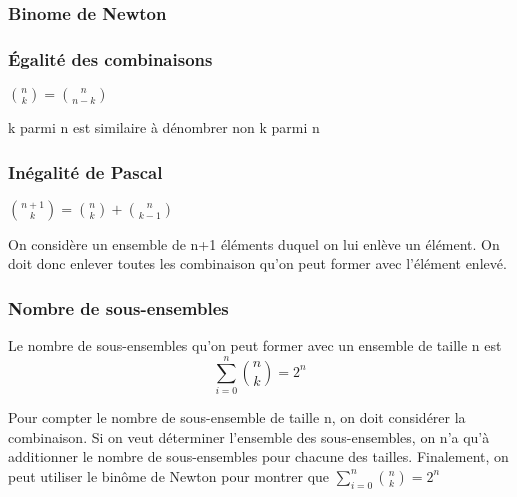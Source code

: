 \documentclass{article}
\begin{document}
\subsubsection{Binome de Newton}%
\label{ssub:Binome de Newton}

\subsubsection{Égalité des combinaisons}%
\label{ssub:Égalité des combinaisons}

\begin{theorem}
    $ {n \choose k} = {n \choose n-k} $
\end{theorem}

\begin{intuition}
    k parmi n est similaire à dénombrer non k parmi n
\end{intuition}

\subsubsection{Inégalité de Pascal}%
\label{ssub:Inégalité de Pascal}

\begin{theorem}
    $ {n+1 \choose k} = {n \choose k} + {n \choose k-1} $
\end{theorem}

\begin{intuition}
    On considère un ensemble de n+1 éléments duquel on lui enlève un
    élément. On doit donc enlever toutes les combinaison qu'on peut former
    avec l'élément enlevé.
\end{intuition}

\subsubsection{Nombre de sous-ensembles}%
\label{ssub:Nombre de sous-ensembles}

\begin{theorem}
    Le nombre de sous-ensembles qu'on peut former avec un ensemble de
    taille n est $$ \sum^{n}_{i=0} {n \choose k} = 2^n $$
\end{theorem}

\begin{intuition}
    Pour compter le nombre de sous-ensemble de taille n, on doit considérer
    la combinaison. Si on veut déterminer l'ensemble des sous-ensembles, on
    n'a qu'à additionner le nombre de sous-ensembles pour chacune des
    tailles. Finalement, on peut utiliser le binôme de Newton pour montrer
    que $ \sum^{n}_{i=0} {n \choose k} = 2^n $
\end{intuition}
\end{document}
